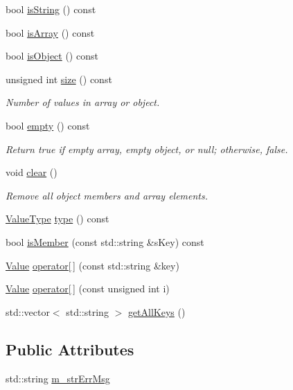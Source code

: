 \begin{DoxyCompactItemize}
bool \hyperlink{class_json_1_1_value_a71e1f82cf1c3eaf969d400dcffb163a6}{is\+String} () const
\item 
bool \hyperlink{class_json_1_1_value_a1627eb9d6568d6d0252fa8bb711c0a59}{is\+Array} () const
\item 
bool \hyperlink{class_json_1_1_value_a8cf96c0f2a552051fcfc78ffee60e037}{is\+Object} () const
\item 
unsigned int \hyperlink{class_json_1_1_value_a3cde6bd042f16442791fa816a60332e5}{size} () const
\begin{DoxyCompactList}\small\item\em Number of values in array or object. \end{DoxyCompactList}\item 
bool \hyperlink{class_json_1_1_value_a0519a551e37ee6665d74742b3f96bab3}{empty} () const
\begin{DoxyCompactList}\small\item\em Return true if empty array, empty object, or null; otherwise, false. \end{DoxyCompactList}\item 
void \hyperlink{class_json_1_1_value_a501a4d67e6c875255c2ecc03ccd2019b}{clear} ()
\begin{DoxyCompactList}\small\item\em Remove all object members and array elements. \end{DoxyCompactList}\item 
\hyperlink{namespace_json_a7d654b75c16a57007925868e38212b4e}{Value\+Type} \hyperlink{class_json_1_1_value_a8ce61157a011894f0252ceed232312de}{type} () const
\item 
bool \hyperlink{class_json_1_1_value_a0daec7ab118bed59dea6b16d1511bc47}{is\+Member} (const std\+::string \&s\+Key) const
\item 
\hyperlink{class_json_1_1_value}{Value} \hyperlink{class_json_1_1_value_a72e69b730d35131d867f47f13980c9c2}{operator\mbox{[}$\,$\mbox{]}} (const std\+::string \&key)
\item 
\hyperlink{class_json_1_1_value}{Value} \hyperlink{class_json_1_1_value_a9cc9f4b9ec45429586e60472a7c25059}{operator\mbox{[}$\,$\mbox{]}} (const unsigned int i)
\item 
std\+::vector$<$ std\+::string $>$ \hyperlink{class_json_1_1_value_af7ab87d24164058af2b20e67ac4a1093}{get\+All\+Keys} ()
\end{DoxyCompactItemize}
\subsection*{Public Attributes}
\begin{DoxyCompactItemize}
\item 
std\+::string \hyperlink{class_json_1_1_value_aced2ebc80b7cdb15b35e858df1f0b886}{m\+\_\+str\+Err\+Msg}
\end{DoxyCompactItemize}
